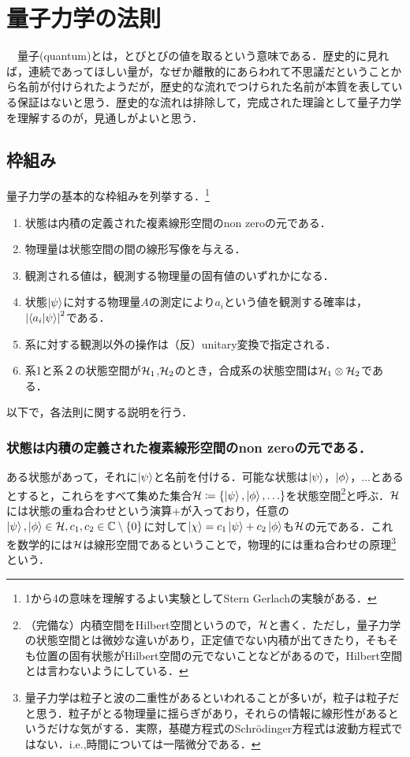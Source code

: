 \section{量子力学の法則}
　量子(quantum)とは，とびとびの値を取るという意味である．歴史的に見れば，連続であってほしい量が，なぜか離散的にあらわれて不思議だということから名前が付けられたようだが，歴史的な流れでつけられた名前が本質を表している保証はないと思う．歴史的な流れは排除して，完成された理論として量子力学を理解するのが，見通しがよいと思う．
\subsection{枠組み}
量子力学の基本的な枠組みを列挙する．\footnote{1から4の意味を理解するよい実験としてStern Gerlachの実験がある．}
\begin{enumerate}
    \item 状態は内積の定義された複素線形空間のnon zeroの元である．\label{axiom.1}
    \item 物理量は状態空間の間の線形写像を与える．\label{axiom.2}
    \item 観測される値は，観測する物理量の固有値のいずれかになる．\label{axiom.3}
    \item 状態$\ket{\psi}$に対する物理量$A$の測定により$a_i$という値を観測する確率は，$\abs{\braket{a_i}{\psi}}^2$である．\label{axiom.4}
    \item 系に対する観測以外の操作は（反）unitary変換で指定される．
    \item 系1と系２の状態空間が$\mathcal{H}_1$,$\mathcal{H}_2$のとき，合成系の状態空間は$\mathcal{H}_1\otimes\mathcal{H}_2$である．
\end{enumerate}

以下で，各法則に関する説明を行う．
    \subsubsection*{状態は内積の定義された複素線形空間のnon zeroの元である．}
    

    ある状態があって，それに$\ket{\psi}$と名前を付ける．可能な状態は$\ket{\psi}$，$\ket{\phi}$，$\ldots$とあるとすると，これらをすべて集めた集合$\mathcal{H}\coloneqq\qty{\ket{\psi},\ket{\phi},\ldots}$を状態空間\footnote{（完備な）内積空間をHilbert空間というので，$\mathcal{H}$と書く．ただし，量子力学の状態空間とは微妙な違いがあり，正定値でない内積が出てきたり，そもそも位置の固有状態がHilbert空間の元でないことなどがあるので，Hilbert空間とは言わないようにしている．}と呼ぶ．$\mathcal{H}$には状態の重ね合わせという演算$+$が入っており，任意の$\ket{\psi},\ket{\phi}\in\mathcal{H}, c_1,c_2\in\mathbb{C}\setminus\qty{0}$に対して$\ket{\chi}=c_1\ket{\psi}+c_2\ket{\phi}$も$\mathcal{H}$の元である．これを数学的には$\mathcal{H}$は線形空間であるということで，物理的には重ね合わせの原理\footnote{量子力学は粒子と波の二重性があるといわれることが多いが，粒子は粒子だと思う．粒子がとる物理量に揺らぎがあり，それらの情報に線形性があるというだけな気がする．実際，基礎方程式のSchr\"{o}dinger方程式は波動方程式ではない．i.e.,時間については一階微分である．}という．
    
